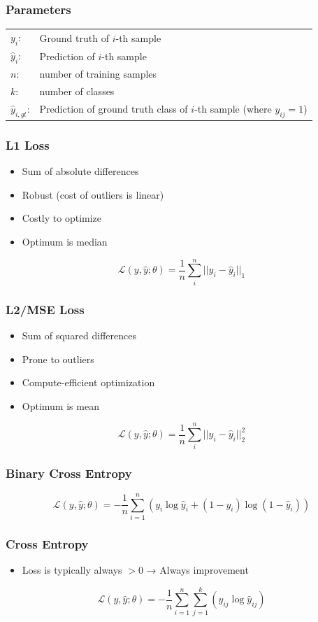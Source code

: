 \documentclass[10pt,a4paper]{article}
\begin{document}
\subsubsection{Parameters}
\begin{tabular}{ll}
	$y_i$: & Ground truth of $i$-th sample \\
	$\hat y_i$: & Prediction of $i$-th sample \\
	$n$: & number of training samples \\
	$k$: & number of classes \\
	$\hat y_{i, gt}$: & Prediction of ground truth class of $i$-th sample (where $y_{ij} = 1$)
\end{tabular}

\subsubsection{L1 Loss}
\begin{itemize}
	\item Sum of absolute differences
	\item Robust (cost of outliers is linear)
	\item Costly to optimize
	\item Optimum is median
\end{itemize}
$$
	\mathcal L(y, \hat y; \theta) = \frac 1 n \sum_i^n ||y_i - \hat y_i||_1
$$

\subsubsection{L2/MSE Loss}
\begin{itemize}
	\item Sum of squared differences
	\item Prone to outliers
	\item Compute-efficient optimization
	\item Optimum is mean
\end{itemize}
$$
	\mathcal L(y, \hat y; \theta) = \frac 1 n \sum_i^n ||y_i - \hat y_i||_2^2
$$

\subsubsection{Binary Cross Entropy}
$$
	\mathcal L(y, \hat y; \theta) = - \frac 1 n \sum_{i = 1}^n (y_i \log \hat y_i + (1 - y_i) \log(1 - \hat y_i))
$$

\subsubsection{Cross Entropy}
\begin{itemize}
	\item Loss is typically always $> 0$ → Always improvement
\end{itemize}
$$
	\mathcal L(y, \hat y; \theta) = - \frac 1 n \sum_{i = 1}^n \sum_{j = 1}^k (y_{ij} \log \hat y_{ij})
$$
\end{document}
